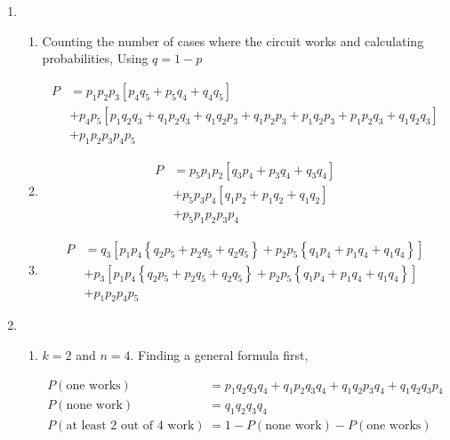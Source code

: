 \begin{enumerate}
\begin{enumerate}
	\end{enumerate}
	
	\item \begin{enumerate}
		\item Counting the number of cases where the circuit works and calculating probabilities, Using $ q = 1-p $
		
			\begin{align}
				P &= p_1 p_2 p_3 \left[ p_4 q_5 + p_5 q_4 + q_4 q_5 \right] \nonumber \\
				&+ p_4 p_5 \left[ p_1 q_2 q_3 + q_1 p_2 q_3 + q_1 q_2 p_3 + q_1 p_2 p_3 + p_1 q_2 p_3 + p_1 p_2 q_3 + q_1 q_2 q_3 \right]	\nonumber \\
				&+ p_1 p_2 p_3 p_4 p_5
			\end{align}
		
		
		\item 
			\begin{align}
				P &= p_5 p_1 p_2 \left[ q_3 p_4 + p_3 q_4 + q_3 q_4 \right] \nonumber \\
				&+ p_5 p_3 p_4 \left[ q_1 p_2 + p_1 q_2 + q_1 q_2 \nonumber \right] \\
				&+ p_5 p_1 p_2 p_3 p_4
			\end{align}
		
		
		\item 
			\begin{align}
				P &= q_3 \left[ p_1 p_4 \left\{ q_2 p_5 + p_2 q_5 + q_2 q_5 \right\} + p_2 p_5 \left\{ q_1 p_4 + p_1 q_4 + q_1 q_4 \right\} \right] \nonumber \\
				&+ p_3 \left[ p_1 p_4 \left\{ q_2 p_5 + p_2 q_5 + q_2 q_5 \right\} + p_2 p_5 \left\{ q_1 p_4 + p_1 q_4 + q_1 q_4 \right\} \right] \nonumber \\
				&+ p_1 p_2 p_4 p_5 
			\end{align}
		
	\end{enumerate}
	
	\item \begin{enumerate}
		\item $ k = 2 $ and $ n = 4 $. Finding a general formula first, 
		
		
			\begin{align}
				P(\text{one works}) &= p_1 q_2 q_3 q_4 + q_1 p_2 q_3 q_4 + q_1 q_2 p_3 q_4 + q_1 q_2 q_3 p_4 \\
				P(\text{none work}) &= q_1 q_2 q_3 q_4 \\
				P(\text{at least 2 out of 4 work}) &= 1 - P(\text{none work}) - P(\text{one works})
			\end{align}
		

\end{enumerate}
\end{enumerate}
